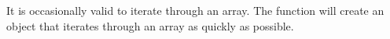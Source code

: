 It is occasionally valid to iterate through an array. 
The function  will create an object that iterates through an array as quickly as possible.

